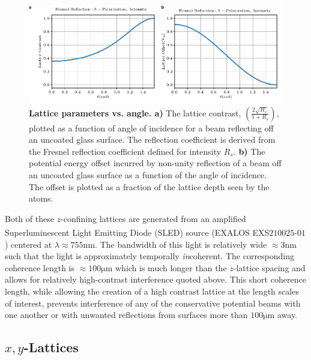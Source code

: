 \begin{figure}[t!]
		\includegraphics[width=\columnwidth]{figures/ch2/heating_rates/axLatRefv2edit.pdf} 
		\caption{\textbf{Lattice parameters vs. angle. a)} The lattice contrast, $\left ( \frac{2 \sqrt{R_s}}{1 + R_s}\right )$, plotted as a function of angle of incidence for a beam reflecting off an uncoated glass surface. The reflection coefficient is derived from the Fresnel reflection coefficient defined for intensity $R_s$. \textbf{b)} The potential energy offset incurred by non-unity reflection of a beam off an uncoated glass surface as a function of the angle of incidence. The offset is plotted as a fraction of the lattice depth seen by the atoms.}
		\label{fig:axLatt}	
\end{figure}

Both of these $z$-confining lattices are generated from an amplified Superluminescent Light Emitting Diode (SLED) source (EXALOS\textsuperscript{\textregistered} EXS$210025$-$01$) centered at $\lambda \approx 755\mathrm{nm}$. The bandwidth of this light is relatively wide $\approx 3 \mathrm{nm}$ such that the light is approximately temporally \emph{in}coherent. The corresponding coherence length is $\approx 100 \mathrm{\mu m}$ which is much longer than the $z$-lattice spacing and allows for relatively high-contrast interference quoted above. This short coherence length, while allowing the creation of a high contrast lattice at the length scales of interest, prevents interference of any of the conservative potential beams with one another or with unwanted reflections from surfaces more than $100 \mathrm{\mu m}$ away.

\subsection{$x,y$-Lattices}

